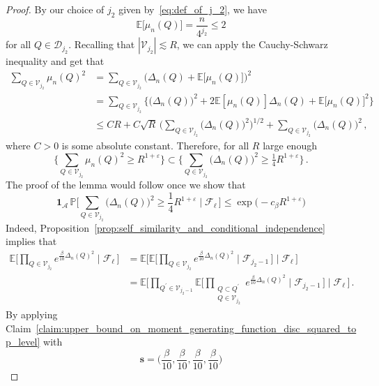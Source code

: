 \documentclass[11pt]{amsart}
\theoremstyle{definition}
\theoremstyle{remark}
\numberwithin{equation}{section}
\def\eps{{\varepsilon}}
\newcommand{\bP}{\mathbb P}
\newcommand{\bE}{\mathbb E}
\begin{document}
	\begin{proof}
		By our choice of $j_2$ given by~\eqref{eq:def_of_j_2}, we have
		\[
		\bE\big[\mu_n(Q)\big] = \frac{n}{4^{j_2}} \le 2
		\]
		for all $Q\in \mathcal{D}_{j_2}$. Recalling that $|\mathcal{V}_{j_2}| \lesssim R$, we can apply the Cauchy-Schwarz inequality and get that
		\begin{align*}
			\sum_{Q\in \mathcal{V}_{j_2}} \mu_n(Q)^2 &= \sum_{Q\in \mathcal{V}_{j_2}} \big(\Delta_n(Q) + \bE\big[\mu_n(Q)\big]\big)^2 \\ &= \sum_{Q\in \mathcal{V}_{j_2}} \Big\{ \big(\Delta_n(Q)\big)^2 + 2\bE[\mu_n(Q)]  \Delta_n(Q) + \bE\big[\mu_n(Q)\big]^2 \Big\} \\ & \le C R + C \sqrt{R} \, \bigg(\sum_{Q\in \mathcal{V}_{j_2}} \big(\Delta_n(Q)\big)^2\bigg)^{1/2} + \sum_{Q\in \mathcal{V}_{j_2}} \big(\Delta_n(Q)\big)^2 \, ,
		\end{align*}
		where $C>0$ is some absolute constant. Therefore, for all $R$ large enough
		\[
		\Big\{\sum_{Q\in \mathcal{V}_{j_2}} \mu_n(Q)^2 \ge R^{1+\eps}\Big\} \subset \Big\{ \sum_{Q\in \mathcal{V}_{j_2}} \big(\Delta_n(Q)\big)^2 \ge \tfrac{1}{4} R^{1+\eps}\Big\} \, .
		\]
		The proof of the lemma would follow once we show that
		\begin{equation}
			\label{eq:cramer_estimate_on_the_boundary_after_reduction}
			\mathbf{1}_{\mathcal{A}} \, \bP\Big[\sum_{Q\in \mathcal{V}_{j_2}} \big(\Delta_n(Q)\big)^2 \ge \frac{1}{4} R^{1+\eps} \mid \mathcal{F}_\ell \, \Big] \le \exp\Big(-c_\beta R^{1+\eps}\Big)
		\end{equation}
		Indeed, Proposition~\ref{prop:self_similarity_and_conditional_independence} implies that
		\begin{align*}
			\bE\Big[\prod_{Q\in \mathcal{V}_{j_2}} e^{\frac{\beta}{10} \Delta_n(Q)^2} \mid \mathcal{F}_{\ell} \, \Big] &= \bE\bigg[\bE\Big[\prod_{Q\in \mathcal{V}_{j_2}} e^{\frac{\beta}{10} \Delta_n(Q)^2} \mid \mathcal{F}_{j_2-1} \, \Big] \mid \mathcal{F}_{\ell} \, \bigg] \\ &=  \bE\bigg[\prod_{Q^\prime\in \mathcal{V}_{j_2-1}}\bE\Big[\prod_{\substack{Q\subset Q^\prime \\ Q\in \mathcal{V}_{j_2}}} e^{\frac{\beta}{10} \Delta_n(Q)^2} \mid \mathcal{F}_{j_2-1} \, \Big] \mid \mathcal{F}_{\ell} \, \bigg] \, .
		\end{align*}
		By applying Claim~\ref{claim:upper_bound_on_moment_generating_function_disc_squared_top_level} with
		\[
		\boldsymbol{s} = \Big(\frac{\beta}{10},\frac{\beta}{10},\frac{\beta}{10},\frac{\beta}{10}\Big)
\]
\end{proof}
\end{document}
